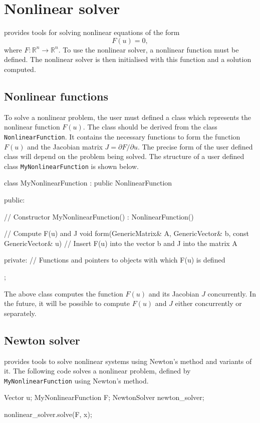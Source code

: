 \chapter{Nonlinear solver}

\dolfin{} provides tools for solving nonlinear equations of the form
\begin{equation}
  F(u) = 0, 
\end{equation}
where $F: \mathbb{R}^{n} \rightarrow \mathbb{R}^{n}$. 
To use the nonlinear solver, a nonlinear function must be defined. 
The nonlinear solver is then initialised with this function and a 
solution computed.

\section{Nonlinear functions}

To solve a nonlinear problem, the user must defined a class which 
represents the nonlinear function $F(u)$. The class 
should be derived from the \dolfin{}  class \texttt{NonlinearFunction}. It
contains the necessary functions to form the function $F(u)$ and the 
Jacobian matrix  $J = \partial F / \partial u$. The precise form of the user 
defined class will depend on the problem being solved.
The structure of a user defined class \texttt{MyNonlinearFunction} is shown below.
%
\small
\begin{code}
class MyNonlinearFunction : public NonlinearFunction
{
public: 
  
 // Constructor 
 MyNonlinearFunction() : NonlinearFunction() {}
  
 // Compute F(u) and J 
 void form(GenericMatrix& A, GenericVector& b, 
           const GenericVector& u)
 {
   // Insert F(u) into the vector b and J into the matrix A 
 }

private:
 // Functions and pointers to objects with which F(u) is defined
};
\end{code}
\normalsize
%
The above class computes the function $F(u)$ and its Jacobian $J$
concurrently. In the future, it will be possible to compute 
$F(u)$ and $J$ either concurrently or separately.

\section{Newton solver}
%
\dolfin{} provides tools to solve nonlinear systems using Newton's method
and variants of it. The following code solves a nonlinear problem, defined by 
\texttt{MyNonlinearFunction} using Newton's method.
%
\begin{code}
Vector u;
MyNonlinearFunction F;
NewtonSolver newton_solver;

nonlinear_solver.solve(F, x);
\end{code}
%

